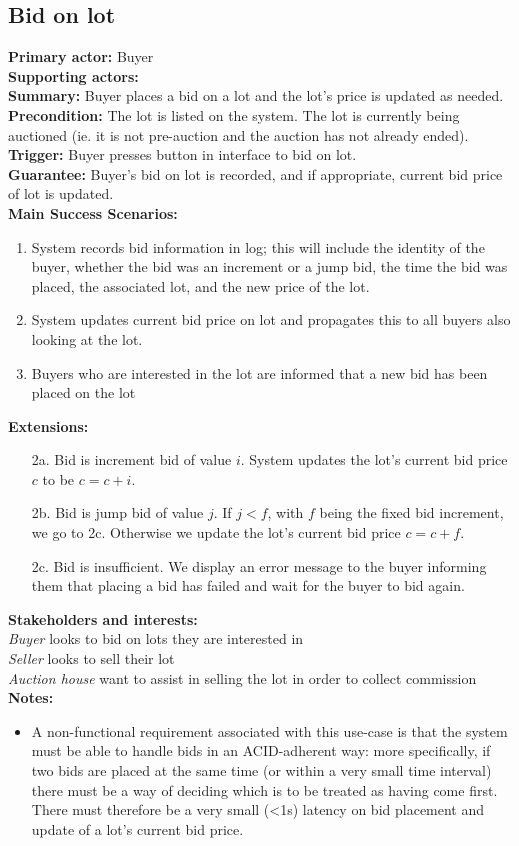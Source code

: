 \documentclass[titlepage, 12pt]{extarticle}
\begin{document}
\subsection{Bid on lot}
{\bf Primary actor: } Buyer
\\{\bf Supporting actors: } 
\\{\bf Summary: } Buyer places a bid on a lot and the lot's price is updated as needed. 
\\{\bf Precondition: } The lot is listed on the system. The lot is currently being auctioned (ie. it is not pre-auction and the auction has not already ended).  
\\{\bf Trigger: } Buyer presses button in interface to bid on lot.
\\{\bf Guarantee: } Buyer's bid on lot is recorded, and if appropriate, current bid price of lot is updated. 
\\{\bf Main Success Scenarios: } 
\begin{enumerate}
\item System records bid information in log; this will include the identity of the buyer, whether the bid was an increment or a jump bid, the time the bid was placed, the associated lot, and the new price of the lot. 
\item System updates current bid price on lot and propagates this to all buyers also looking at the lot. 
\item Buyers who are interested in the lot are informed that a new bid has been placed on the lot
\end{enumerate}
  {\bf Extensions: }
\begin{itemize}
\item [2a.] Bid is increment bid of value $i$. System updates the lot's current bid price $c$ to be $c = c + i$.
\item [2b.] Bid is jump bid of value $j$. If $j < f$, with $f$ being the fixed bid increment, we go to 2c. Otherwise we update the lot's current bid price $c = c + f$.
\item [2c.] Bid is insufficient. We display an error message to the buyer informing them that placing a bid has failed and wait for the buyer to bid again. 
\end{itemize}
{\bf Stakeholders and interests: }
\\{\em Buyer} looks to bid on lots they are interested in
\\{\em Seller} looks to sell their lot
\\{\em Auction house} want to assist in selling the lot in order to collect commission
\\{\bf Notes:}
\begin{itemize}
  \item A non-functional requirement associated with this use-case is that the system must be able to handle bids in an ACID-adherent way: more specifically, if two bids are placed at the same time (or within a very small time interval) there must be a way of deciding which is to be treated as having come first. There must therefore be a very small (<1s) latency on bid placement and update of a lot's current bid price. 
\end{itemize}
\end{document}
